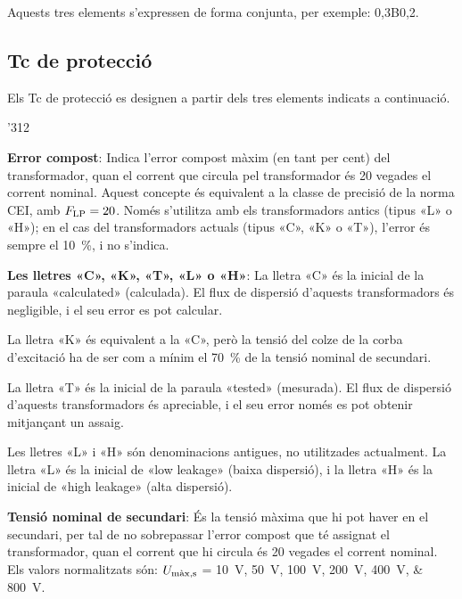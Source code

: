 Aquests tres elements s'expressen de forma conjunta, per exemple:
0,3B0,2.

\subsection{Tc de protecció}

Els Tc de protecció es designen a
partir dels tres elements indicats a continuació.

\begin{dingautolist}{'312}
    \item \textbf{Error compost}: Indica l'error compost màxim (en tant per cent) del
    transformador, quan el corrent que circula pel
    transformador és 20 vegades el corrent nominal. Aquest concepte
     és equivalent a la classe de precisió de la norma CEI,
     amb $F_\mathrm{LP}=20$. Només s'utilitza amb els transformadors antics (tipus «L» o «H»); en el cas del transformadors actuals
     (tipus «C», «K» o «T»), l'error és sempre el \SI{10}{\percent}, i no s'indica.

    \item \textbf{Les lletres «C», «K», «T», «L» o «H»}: La lletra «C» és la inicial de la
    paraula  «calculated» (calculada). El flux de dispersió d'aquests transformadors és negligible, i el seu error es pot calcular.

    La lletra «K» és equivalent a la «C», però la tensió del colze de la corba d'excitació ha de ser com a mínim el \SI{70}{\percent}
    de la tensió nominal de secundari.

    La lletra «T» és la inicial de la   paraula  «tested» (mesurada). El flux de dispersió d'aquests transformadors és apreciable, i el seu error només es pot obtenir mitjançant un assaig.

    Les lletres «L» i «H» són denominacions antigues,  no utilitzades actualment. La lletra «L» és la inicial de «low leakage» (baixa
    dispersió), i la lletra «H» és la inicial de «high leakage» (alta dispersió).

    \item \textbf{Tensió nominal de secundari}: És la tensió màxima
    que hi pot haver en el secundari, per tal de no sobrepassar l'error compost que té
    assignat el transformador, quan el corrent que hi circula
     és 20 vegades el corrent nominal. Els valors
    normalitzats són: $U_\mathrm{m\grave{a}x,s}$ = \SIlist{10; 50; 100; 200; 400; 800}{V}.


\end{dingautolist}
